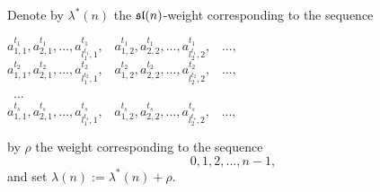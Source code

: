 \documentclass[10pt]{amsart}\oddsidemargin -1mm \evensidemargin -1mm \topmargin -15mm\headheight5mm \headsep 3.5mm \textheight 245mm\textwidth 170mm %
\begin{document}
Denote by $\lambda^*(n)$ the $\frak{sl}(n)$-weight corresponding to the sequence
\begin{center}$a^{t_1}_{1, 1}, a^{t_1}_{2, 1}, ..., a^{t_1}_{l_1^{t_1}, 1}, \hspace{10pt}a^{t_1}_{1, 2}, a^{t_1}_{2, 2}, ..., a^{t_1}_{l_2^{t_1}, 2},\hspace{10pt}...,$\\
$a^{t_2}_{1, 1}, a^{t_2}_{2, 1}, ..., a^{t_2}_{l_1^{t_2}, 1}, \hspace{10pt}a^{t_2}_{1, 2}, a^{t_2}_{2, 2}, ..., a^{t_2}_{l_2^{t_2}, 2},\hspace{10pt}...,$\\{~}...{~}\\
$a^{t_s}_{1, 1}, a^{t_s}_{2, 1}, ..., a^{t_s}_{l_1^{t_s}, 1},\hspace{10pt} a^{t_s}_{1, 2}, a^{t_s}_{2, 2}, ..., a^{t_s}_{l_2^{t_s}, 2},\hspace{10pt}...,$\end{center} by $\rho$ the weight corresponding to the sequence
$$0, 1, 2,..., n-1,$$ and set $\lambda(n):=\lambda^*(n)+\rho$.
\end{document}
